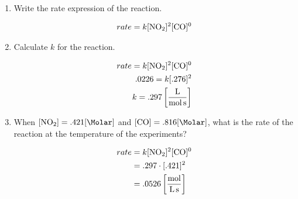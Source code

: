 \documentclass[12pt]{article}
\begin{document}
\begin{enumerate}
\begin{enumerate}
      \item Write the rate expression of the reaction.

        \begin{equation}
          \begin{split}
            rate=k[\ce{NO2}]^2[\ce{CO}]^0
          \end{split}
          \label{6}
        \end{equation}

      \item Calculate $k$ for the reaction.

        \begin{equation}
          \begin{split}
            rate=k[\ce{NO2}]^2[\ce{CO}]^0\\
            .0226=k[.276]^2\\
            k=.297\left[ \frac{\si{\liter}}{\si{\mole\second}} \right]
          \end{split}
          \label{7}
        \end{equation}

      \item When $[\ce{NO2}]=.421[\si{\Molar}]$ and $[\ce{CO}]=.816[\si{\Molar}]$, what is the rate of the reaction at the temperature of the experiments?

        \begin{equation}
          \begin{split}
            rate&=k[\ce{NO2}]^2[\ce{CO}]^0\\
            &=.297\cdot[.421]^2\\
            &=.0526\left[ \frac{\si{\mole}}{\si{\liter\second}} \right]
          \end{split}
          \label{8}
        \end{equation}

    \end{enumerate}
  
\end{enumerate}
\end{document}
